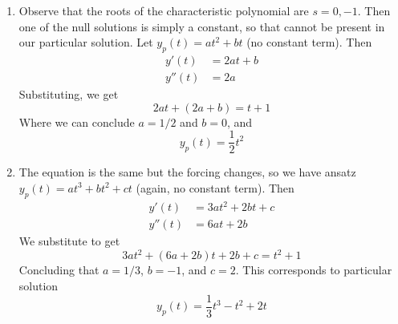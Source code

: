 \documentclass[a4paper]{article}
\begin{document}
\begin{enumerate}[label=(\alph*)]
	\item Observe that the roots of the characteristic polynomial are \( s = 0, -1 \). Then one of the null solutions is simply a constant, so that cannot be present in our particular solution. Let \( y_{p } \!\left( t  \right) = at^{2} + bt \) (no constant term). Then
		\begin{align*}
			y'\!\left( t  \right) & = 2at + b  \\
			y''\!\left( t  \right) & = 2a
		\end{align*}
	Substituting, we get
	\[
		2at + \!\left( 2a + b  \right) = t + 1 
	\]
	Where we can conclude \( a = 1/2 \) and \( b = 0 \), and
	\[
		y_{p } \!\left( t  \right) = \frac{1}{2}t^{2} 
	\]
	\item The equation is the same but the forcing changes, so we have ansatz \( y_{p } \!\left( t  \right) = at^{3} + bt^{2} + ct  \) (again, no constant term). Then
		\begin{align*}
			y'\!\left( t  \right) & = 3at^{2} + 2bt + c  \\[12pt]
			y''\!\left( t  \right) & = 6at + 2b
		\end{align*}
	We substitute to get
	\[
		3at^{2} + \!\left( 6a + 2b \right)t + 2b + c = t^{2} + 1 
	\]
	Concluding that \( a = 1/3 \), \( b = -1 \), and \( c = 2 \). This corresponds to particular solution
	\[
		y_{p }\!\left( t  \right) = \frac{1}{3}t^{3} - t^{2} + 2t 
	\]
\end{enumerate}

\end{document}
